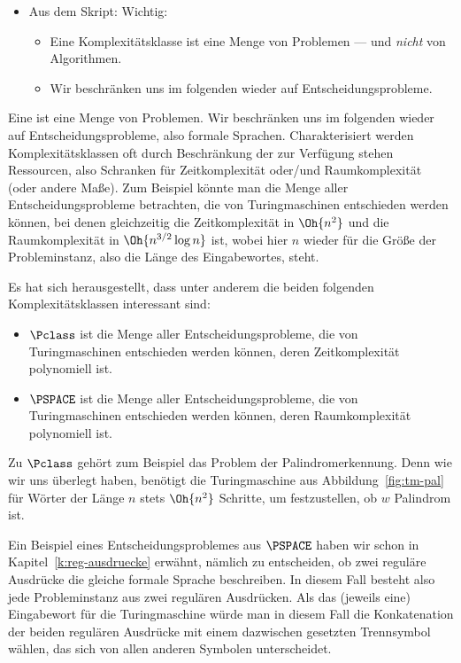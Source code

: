 \begin{tutorium}
  \begin{itemize}
  \item Aus dem Skript: Wichtig: 
    \begin{itemize}
    \item Eine Komplexitätsklasse ist eine Menge von Problemen ---
      und \emph{nicht} von Algorithmen.
    \item Wir beschränken uns im folgenden wieder auf
      Entscheidungsprobleme.
    \end{itemize}
  \end{itemize}
\end{tutorium}
Eine  ist eine
Menge von Problemen. Wir beschränken uns im folgenden wieder auf
Entscheidungsprobleme, also formale Sprachen. Charakterisiert werden
Komplexitätsklassen oft durch Beschränkung der zur Verfügung stehen
Ressourcen, also Schranken für Zeitkomplexität oder/und
Raumkomplexität (oder andere Maße). Zum Beispiel könnte man die Menge
aller Entscheidungsprobleme betrachten, die von Turingmaschinen
entschieden werden können, bei denen gleichzeitig die Zeitkomplexität
in $\Oh{n^2}$ und die Raumkomplexität in $\Oh{n^{3/2}\log n}$ ist,
wobei hier $n$ wieder für die Größe der Probleminstanz, also die Länge
des Eingabewortes, steht.

Es hat sich herausgestellt, dass unter anderem die beiden folgenden
Komplexitätsklassen interessant sind:
%
\begin{itemize}
\item $\Pclass$ ist die Menge aller Entscheidungsprobleme, die von
  Turingmaschinen entschieden werden können, deren Zeitkomplexität
  polynomiell ist.
\item $\PSPACE$ ist die Menge aller
  Entscheidungsprobleme, die von Turingmaschinen entschieden werden
  können, deren Raumkomplexität polynomiell ist.
\end{itemize}
%
Zu $\Pclass$ gehört zum Beispiel das Problem der Palindromerkennung. Denn
wie wir uns überlegt haben, benötigt die Turingmaschine aus
Abbildung~\ref{fig:tm-pal} für Wörter der Länge $n$ stets $\Oh{n^2}$
Schritte, um festzustellen, ob $w$ Palindrom ist.

Ein Beispiel eines Entscheidungsproblemes aus $\PSPACE$ haben wir
schon in Kapitel~\ref{k:reg-ausdruecke} erwähnt, nämlich zu
entscheiden, ob zwei reguläre Ausdrücke die gleiche formale Sprache
beschreiben. In diesem Fall besteht also jede Probleminstanz aus zwei
regulären Ausdrücken. Als das (jeweils eine) Eingabewort für die
Turingmaschine würde man in diesem Fall die Konkatenation der beiden
regulären Ausdrücke mit einem dazwischen gesetzten Trennsymbol wählen,
das sich von allen anderen Symbolen unterscheidet.

